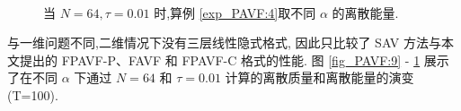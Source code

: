 \begin{figure}[H]
	\begin{center}
	\\
	\caption{当  $N = 64, \tau=0.01$ 时,算例 \ref{exp_PAVF:4}取不同 $\alpha$ 的离散能量.}
	\label{fig_PAVF:10}
	\end{center}
	\end{figure}
	与一维问题不同,二维情况下没有三层线性隐式格式, 因此只比较了 SAV 方法与本文提出的 FPAVF-P、FAVF 和 FPAVF-C 格式的性能.
	图 \ref{fig_PAVF:9} - \ref{fig_PAVF:10} 展示了在不同 $\alpha$ 下通过 $N=64$ 和 $\tau=0.01$ 计算的离散质量和离散能量的演变(T=100).
